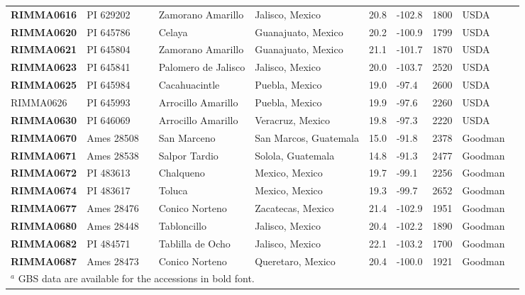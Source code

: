 \begin{table}[h]
\begin{center}
{\begin{tabular}{llllllllll}
{\bf RIMMA0616}	&	PI 629202	&		&	Zamorano Amarillo	&	Jalisco, Mexico	&	20.8 	&	-102.8 	&	1800	&	USDA	\\
{\bf RIMMA0620}	&	PI 645786	&		&	Celaya	&	Guanajuato, Mexico	&	20.2 	&	-100.9 	&	1799	&	USDA	\\
{\bf RIMMA0621}	&	PI 645804	&		&	Zamorano Amarillo	&	Guanajuato, Mexico	&	21.1 	&	-101.7 	&	1870	&	USDA	\\
{\bf RIMMA0623}	&	PI 645841	&		&	Palomero de Jalisco	&	Jalisco, Mexico	&	20.0 	&	-103.7 	&	2520	&	USDA	\\
{\bf RIMMA0625}	&	PI 645984	&		&	Cacahuacintle	&	Puebla, Mexico	&	19.0 	&	-97.4 	&	2600	&	USDA	\\
RIMMA0626	&	PI 645993	&		&	Arrocillo Amarillo	&	Puebla, Mexico	&	19.9 	&	-97.6 	&	2260	&	USDA	\\
{\bf RIMMA0630}	&	PI 646069	&		&	Arrocillo Amarillo	&	Veracruz, Mexico	&	19.8 	&	-97.3 	&	2220	&	USDA	\\
{\bf RIMMA0670}	&	Ames 28508	&		&	San Marceno	&	San Marcos, Guatemala	&	15.0 	&	-91.8 	&	2378	&	Goodman	\\
{\bf RIMMA0671}	&	Ames 28538	&		&	Salpor Tardio	&	Solola, Guatemala	&	14.8 	&	-91.3 	&	2477	&	Goodman	\\
{\bf RIMMA0672}	&	PI 483613	&		&	Chalqueno	&	Mexico, Mexico	&	19.7 	&	-99.1 	&	2256	&	Goodman	\\
{\bf RIMMA0674}	&	PI 483617	&		&	Toluca	&	Mexico, Mexico	&	19.3 	&	-99.7 	&	2652	&	Goodman	\\
{\bf RIMMA0677}	&	Ames 28476 	&		&	Conico Norteno	&	Zacatecas, Mexico	&	21.4 	&	-102.9 	&	1951	&	Goodman	\\
{\bf RIMMA0680}	&	Ames 28448	&		&	Tabloncillo	&	Jalisco, Mexico	&	20.4 	&	-102.2 	&	1890	&	Goodman	\\
{\bf RIMMA0682}	&	PI 484571	&		&	Tablilla de Ocho	&	Jalisco, Mexico	&	22.1 	&	-103.2 	&	1700	&	Goodman	\\
{\bf RIMMA0687}	&	Ames 28473	&		&	Conico Norteno	&	Queretaro, Mexico	&	20.4 	&	-100.0 	&	1921	&	Goodman	\\[-0.1mm]	
	\hline\hline
\multicolumn{9}{l}{$^a$ GBS data are available for the accessions in bold font.}\\
    \end{tabular}}
    \label{srkid}

\end{center} 

\end{table}

